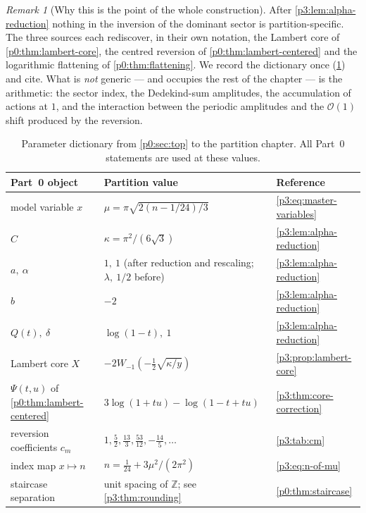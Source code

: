 \documentclass[11pt,a4paper,oneside]{book}
\theoremstyle{plain}
\theoremstyle{definition}
\theoremstyle{remark}
\newtheorem{remark}[theorem]{Remark}
\newcommand{\Int}{\mathbb{Z}}
\newcommand{\bigO}{\mathcal{O}}
\newcommand{\Wlam}{W}
\begin{document}
\begin{remark}[Why this is the point of the whole construction]
\label{p3:rem:reduction-is-the-point}
After \cref{p3:lem:alpha-reduction} nothing in the inversion of the dominant sector is
partition-specific. The three sources each rediscover, in their own notation, the Lambert core of
\cref{p0:thm:lambert-core}, the centred reversion of \cref{p0:thm:lambert-centered} and the
logarithmic flattening of \cref{p0:thm:flattening}. We record the dictionary once
(\cref{p3:tab:dictionary}) and cite. What is \emph{not} generic --- and occupies the rest of the
chapter --- is the arithmetic: the sector index, the Dedekind-sum amplitudes, the accumulation of
actions at $1$, and the interaction between the periodic amplitudes and the $\bigO(1)$ shift
produced by the reversion.
\end{remark}

\begin{table}[htbp]
\centering
\caption{Parameter dictionary from \cref{p0:sec:top} to the partition
chapter.  All Part~0 statements are used at these values.}
\label{p3:tab:dictionary}
\small
\begin{tabular}{@{}lll@{}}
\toprule
Part~0 object & Partition value & Reference \\
\midrule
model variable $x$ & $\mu=\pi\sqrt{2(n-1/24)/3}$ & \cref{p3:eq:master-variables}\\
$C$ & $\kappa=\pi^{2}/(6\sqrt3)$ & \cref{p3:lem:alpha-reduction}\\
$a,\ \alpha$ & $1,\ 1$ (after reduction and rescaling; $\lambda,\ 1/2$ before) & \cref{p3:lem:alpha-reduction}\\
$b$ & $-2$ & \cref{p3:lem:alpha-reduction}\\
$Q(t),\ \delta$ & $\log(1-t),\ 1$ & \cref{p3:lem:alpha-reduction}\\
Lambert core $X$ & $-2\Wlam_{-1}\!\left(-\tfrac12\sqrt{\kappa/y}\right)$ & \cref{p3:prop:lambert-core}\\
$\Psi(t,u)$ of \cref{p0:thm:lambert-centered} & $3\log(1+tu)-\log(1-t+tu)$ & \cref{p3:thm:core-correction}\\
reversion coefficients $c_m$ & $1,\tfrac52,\tfrac{13}3,\tfrac{53}{12},-\tfrac{14}5,\dots$ & \cref{p3:tab:cm}\\
index map $x\mapsto n$ & $n=\tfrac1{24}+3\mu^{2}/(2\pi^{2})$ & \cref{p3:eq:n-of-mu}\\
staircase separation & unit spacing of $\Int$; see \cref{p3:thm:rounding} & \cref{p0:thm:staircase}\\
\bottomrule
\end{tabular}
\end{table}
\end{document}
